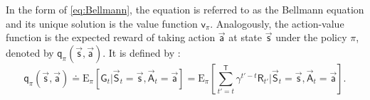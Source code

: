 In the form of \eqref{eq:Bellmann}, the equation is referred to as the Bellmann equation and its unique solution is the value function $\mathsf{v}_\pi$. Analogously, the action-value function is the expected reward of taking action $\vec{\mathsf{a}}$ at state $\vec{\mathsf{s}}$ under the policy $\pi$, denoted by $\mathsf{q}_\pi(\vec{\mathsf{s}},\vec{\mathsf{a}})$. It is defined by \cite[p. 58-59]{sutton_reinforcement_2018}:
\begin{equation}
	\mathsf{q}_\pi(\vec{\mathsf{s}},\vec{\mathsf{a}}) \doteq \mathrm{E}_\pi \left[ \mathsf{G}_t \vert \vec{\mathsf{S}}_t=\vec{\mathsf{s}}, \vec{\mathsf{A}}_t=\vec{\mathsf{a}} \right] =
	\mathrm{E}_\pi \left[\sum_{t'=t}^{\mathsf{T}}\gamma^{t'-t} \mathsf{R}_{t'} \vert \vec{\mathsf{S}}_t=\vec{\mathsf{s}}, \vec{\mathsf{A}}_t=\vec{\mathsf{a}}\right]. \label{eq:action_value_func} 
\end{equation}
